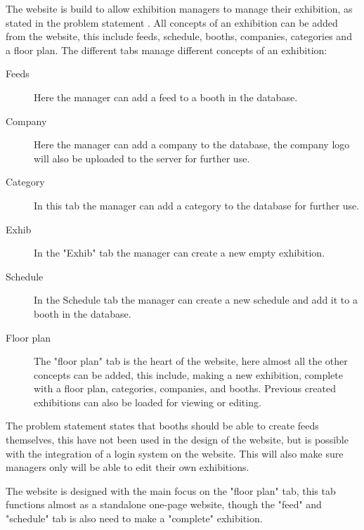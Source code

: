 The website is build to allow exhibition managers to manage their exhibition, as stated in the problem statement . All concepts of an exhibition can be added from the website, this include feeds, schedule, booths, companies, categories and a floor plan.
The different tabs manage different concepts of an exhibition:


\begin{description}
	\item[Feeds] Here the manager can add a feed to a booth in the database.
	\item[Company] Here the manager can add a company to the database, the company logo will also be uploaded to the server for further use.
	\item[Category] In this tab the manager can add a category to the database for further use.
	\item[Exhib] In the "Exhib" tab the manager can create a new empty exhibition.
	\item[Schedule] In the Schedule tab the manager can create a new schedule and add it to a booth in the database.
	\item[Floor plan] The "floor plan" tab is the heart of the website, here almost all the other concepts can be added, this include, making a new exhibition, complete with a floor plan, categories, companies, and booths. Previous created exhibitions can also be loaded for viewing or editing.
\end{description}


The problem statement  states that booths should be able to create feeds themselves, this have not been used in the design of the website, but is possible with the integration of a login system on the website. This will also make sure managers only will be able to edit their own exhibitions.


The website is designed with the main focus on the "floor plan" tab, this tab functions almost as a standalone one-page website, though the "feed" and "schedule" tab is also need to make a "complete" exhibition.


